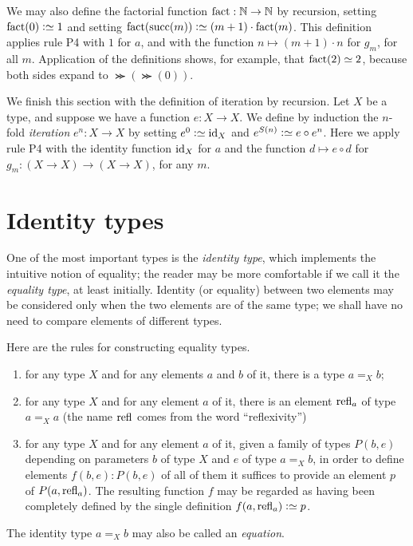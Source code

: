 We may also define the factorial function $\fact : \NN \to \NN$ by recursion, setting $\fact(0) \defeq 1$ and setting
$\fact(\Succ(m)) \defeq (m+1) \cdot \fact(m)$.  This definition applies rule P4 with $1$ for $a$, and with the
function $n \mapsto (m+1) \cdot n$ for $g_m$, for all $m$.
Application of the definitions shows, for example, that $\fact(2) \jdeq 2$, because both sides expand to $\Succ(\Succ(0))$.

We finish this section with the definition of iteration by recursion.  Let $X$ be a type, and suppose we have a function $e : X \to X$.  We
define by induction the $n$-fold \emph{iteration} $e^n : X \to X$ by setting $e^0 \defeq \id_X$ and $e^{S(n)}\defeq e\circ e^n$.
Here we apply rule P4 with the identity function $\mathord{\mathrm{id}}_X$ for $a$
and the function $d \mapsto e\circ d$ for $g_m : (X\to X)\to(X\to X)$, for any $m$.

\section{Identity types}
\label{sec:identity-types}

One of the most important types is the \emph{identity type}, which implements the intuitive notion of equality; the reader may be more
comfortable if we call it the \emph{equality type}, at least initially.  Identity (or equality) between two elements may be considered only when
the two elements are of the same type; we shall have no need to compare elements of different types.

Here are the rules for constructing equality types.
\begin{enumerate}[label=E\arabic*:]
\item
  for any type $X$ and for any elements $a$ and $b$ of it, there is a type $a =_X b$;
\item for any type $X$ and for any element $a$ of it, there is an element $\refl a$ of type $a =_X a$ (the name $\refl{}$ comes from the word
  ``reflexivity'')
\item for any type $X$ and for any element $a$ of it, given a family of types $P(b,e)$ depending on parameters $b$ of type $X$ and $e$ of type
  $a =_X b$, in order to define elements $f(b,e) : P(b,e)$ of all of them it suffices to provide an element $p$ of $P(a,\refl a)$.  The resulting
  function $f$ may be regarded as having been completely defined by the single definition $f(a,\refl a) \defeq p$.
\end{enumerate}

The identity type $a =_X b$ may also be called an \emph{equation}.

